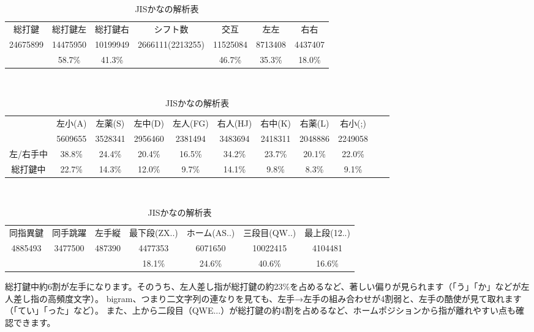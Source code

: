 \begin{table}[htbp]
 \caption{JISかなの解析表}
 \begin{center}
 \begin{tabular}{cccc|ccc}
 \hline
総打鍵 & 総打鍵左 & 総打鍵右 & シフト数 & 交互 & 左左 & 右右 \\
24675899 & 14475950 & 10199949 & 2666111(2213255) & 11525084 & 8713408 & 4437407\\
 & 58.7\% & 41.3\% &  & 46.7\% & 35.3\% & 18.0\%\\
 \hline
 \end{tabular}

 　\vspace{1zw}　

 \begin{tabular}{ccccccccccc}
 \hline
& 左小(A) & 左薬(S) & 左中(D) & 左人(FG) & 右人(HJ) & 右中(K) & 右薬(L) & 右小(;)\\
& 5609655 & 3528341 & 2956460 & 2381494 & 3483694 & 2418311 & 2048886 & 2249058\\
左/右手中 & 38.8\% & 24.4\% & 20.4\% & 16.5\% & 34.2\% & 23.7\% & 20.1\% & 22.0\%\\
総打鍵中 & 22.7\% & 14.3\% & 12.0\% & 9.7\% & 14.1\% & 9.8\% & 8.3\% & 9.1\%\\
\hline
 \end{tabular}

 　\vspace{1zw}　

 \begin{tabular}{ccc|cccc}
 \hline
 同指異鍵 & 同手跳躍 & 左手縦 & 最下段(ZX..) & ホーム(AS..) & 三段目(QW..) & 最上段(12..)\\
4885493 & 3477500 & 487390 & 4477353 & 6071650 & 10022415 & 4104481\\
 &  &  & 18.1\% & 24.6\% & 40.6\% & 16.6\%\\
\hline
 \end{tabular}
 \end{center}
 \label{tbl:jiskana}
\end{table}


総打鍵中約6割が左手になります。そのうち、左人差し指が総打鍵の約23\%を占めるなど、著しい偏りが見られます（「う」「か」などが左人差し指の高頻度文字）。
bigram、つまり二文字列の連なりを見ても、左手→左手の組み合わせが4割弱と、左手の酷使が見て取れます（「てい」「った」など）。
また、上から二段目（QWE...）が総打鍵の約4割を占めるなど、ホームポジションから指が離れやすい点も確認できます。

